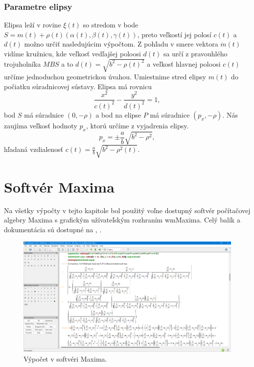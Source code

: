 \subsubsection*{Parametre elipsy}
Elipsa leží v rovine $\xi(t) $ so stredom v bode $S = m(t) + \rho(t)(\alpha(t), \beta(t), \gamma(t))$,  preto veľkostí jej polosí $c(t)$ a $d(t)$ možno určiť nasledujúcim výpočtom.
Z pohľadu v smere vektora $\dot{m}(t)$ vidíme kružnicu, kde veľkosť vedľajšej poloosi $d(t)$ sa určí z pravouhlého trojuholníka $MBS$ a to
$d(t) = \sqrt{b^2 - \rho(t)^2}$
a veľkosť hlavnej poloosi $c(t)$ určíme jednoduchou geometrickou úvahou. Umiestnime stred elipsy $m(t)$ do počiatku súradnicovej sústavy. Elipsa má rovnicu 
$$
\frac{x^2}{c(t)^2} - \frac{y^2}{d(t)^2} = 1,
$$
bod $S$ má súradnice $(0, -\rho)$ a bod na elipse $P$ má súradnice $(p_x, -\rho)$. Nás zaujíma veľkosť hodnoty $p_x$, ktorú určíme z vyjadrenia elipsy.
$$
p_x = \pm \frac{a}{b} \sqrt{b^2 - \rho^2},
$$
hľadaná vzdialenosť $c(t) = \frac{a}{b} \sqrt{b^2 - \rho^2(t)}.$

\section{Softvér Maxima}
Na všetky výpočty v tejto kapitole bol použitý voľne dostupný softvér počítačovej algebry Maxima s grafickým užívateľským rozhraním wmMaxima. Celý balík a dokumentácia sú dostupné na \cite{MaximaDoc}, \cite{MaximaDownload}.

\begin{figure}[h]
	\centering
	\includegraphics[width=\textwidth]{images/maxima.png}
	\caption[Softvér Maxima.]{Výpočet v softvéri Maxima.}
	\label{fig:3D_point_lies}
\end{figure}

